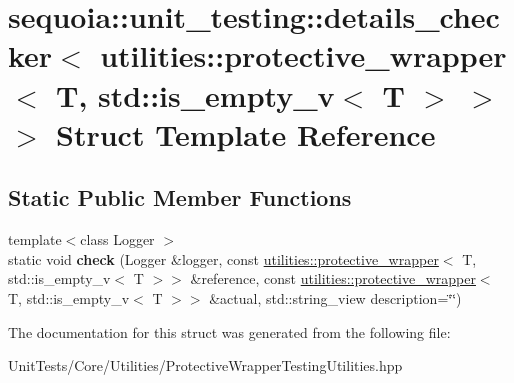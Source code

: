 \hypertarget{structsequoia_1_1unit__testing_1_1details__checker_3_01utilities_1_1protective__wrapper_3_01_t_0d60a80006f0c876d23cf6aa292eea013}{}\section{sequoia\+::unit\+\_\+testing\+::details\+\_\+checker$<$ utilities\+::protective\+\_\+wrapper$<$ T, std\+::is\+\_\+empty\+\_\+v$<$ T $>$ $>$ $>$ Struct Template Reference}
\label{structsequoia_1_1unit__testing_1_1details__checker_3_01utilities_1_1protective__wrapper_3_01_t_0d60a80006f0c876d23cf6aa292eea013}
\subsection*{Static Public Member Functions}
\begin{DoxyCompactItemize}
\item 
\mbox{\label{structsequoia_1_1unit__testing_1_1details__checker_3_01utilities_1_1protective__wrapper_3_01_t_0d60a80006f0c876d23cf6aa292eea013_a531a172fe7ac85b93aeb2de05294f96b}} 
{\footnotesize template$<$class Logger $>$ }\\static void {\bfseries check} (Logger \&logger, const \mbox{\hyperlink{classsequoia_1_1utilities_1_1protective__wrapper}{utilities\+::protective\+\_\+wrapper}}$<$ T, std\+::is\+\_\+empty\+\_\+v$<$ T $>$$>$ \&reference, const \mbox{\hyperlink{classsequoia_1_1utilities_1_1protective__wrapper}{utilities\+::protective\+\_\+wrapper}}$<$ T, std\+::is\+\_\+empty\+\_\+v$<$ T $>$$>$ \&actual, std\+::string\+\_\+view description=\char`\"{}\char`\"{})
\end{DoxyCompactItemize}


The documentation for this struct was generated from the following file\+:\begin{DoxyCompactItemize}
\item 
Unit\+Tests/\+Core/\+Utilities/Protective\+Wrapper\+Testing\+Utilities.\+hpp\end{DoxyCompactItemize}
